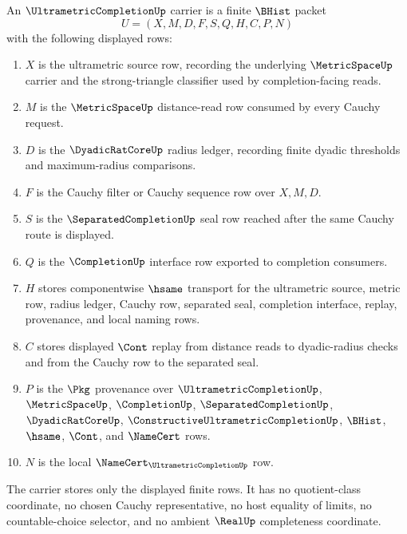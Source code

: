 \begin{definition}
\label{def:ultrametric-completion-carrier}
An $\UltrametricCompletionUp$ carrier is a finite $\BHist$ packet
$$
U=(X,M,D,F,S,Q,H,C,P,N)
$$
with the following displayed rows:
\begin{enumerate}
\item $X$ is the ultrametric source row, recording the underlying $\MetricSpaceUp$ carrier and the strong-triangle classifier used by completion-facing reads.
\item $M$ is the $\MetricSpaceUp$ distance-read row consumed by every Cauchy request.
\item $D$ is the $\DyadicRatCoreUp$ radius ledger, recording finite dyadic thresholds and maximum-radius comparisons.
\item $F$ is the Cauchy filter or Cauchy sequence row over $X,M,D$.
\item $S$ is the $\SeparatedCompletionUp$ seal row reached after the same Cauchy route is displayed.
\item $Q$ is the $\CompletionUp$ interface row exported to completion consumers.
\item $H$ stores componentwise $\hsame$ transport for the ultrametric source, metric row, radius ledger, Cauchy row, separated seal, completion interface, replay, provenance, and local naming rows.
\item $C$ stores displayed $\Cont$ replay from distance reads to dyadic-radius checks and from the Cauchy row to the separated seal.
\item $P$ is the $\Pkg$ provenance over $\UltrametricCompletionUp$, $\MetricSpaceUp$, $\CompletionUp$, $\SeparatedCompletionUp$, $\DyadicRatCoreUp$, $\ConstructiveUltrametricCompletionUp$, $\BHist$, $\hsame$, $\Cont$, and $\NameCert$ rows.
\item $N$ is the local $\NameCert_{\UltrametricCompletionUp}$ row.
\end{enumerate}
The carrier stores only the displayed finite rows. It has no quotient-class coordinate, no chosen Cauchy representative, no host equality of limits, no countable-choice selector, and no ambient $\RealUp$ completeness coordinate.
\end{definition}


